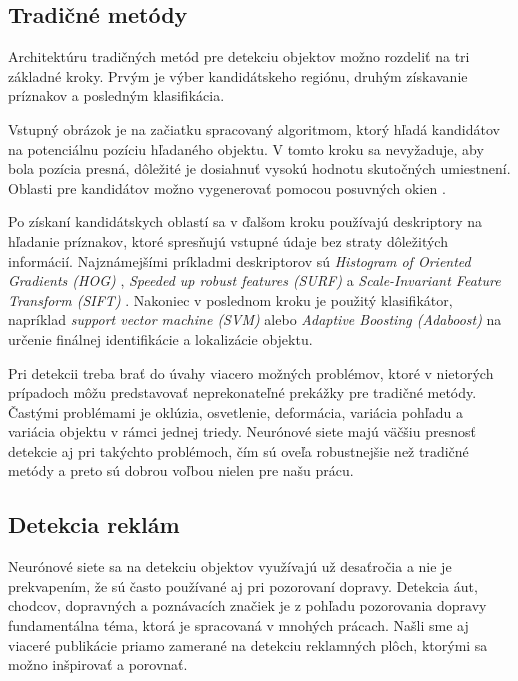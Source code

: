 \subsection{Tradičné metódy}

Architektúru tradičných metód pre detekciu objektov možno rozdeliť na tri základné kroky. Prvým je výber kandidátskeho regiónu, druhým získavanie príznakov a posledným klasifikácia.

Vstupný obrázok je na začiatku spracovaný algoritmom, ktorý hľadá kandidátov na potenciálnu pozíciu hľadaného objektu. V tomto kroku sa nevyžaduje, aby bola pozícia presná, dôležité je dosiahnuť vysokú hodnotu skutočných umiestnení. Oblasti pre kandidátov možno vygenerovať pomocou posuvných okien \cite{sel-search}.

Po získaní kandidátskych oblastí sa v ďalšom kroku používajú deskriptory na hľadanie príznakov, ktoré spresňujú vstupné údaje bez straty dôležitých informácií. Najznámejšími príkladmi deskriptorov sú \textit{Histogram of Oriented Gradients (HOG)} \cite{HOG}, \textit{Speeded up robust features (SURF)} \cite{SURF} a \textit{Scale-Invariant Feature Transform (SIFT)} \cite{SIFT}. Nakoniec v poslednom kroku je použitý klasifikátor, napríklad \textit{support vector machine (SVM)} \cite{SVM} alebo \textit{Adaptive Boosting (Adaboost)} \cite{Adaboost} na určenie finálnej identifikácie a lokalizácie objektu.

Pri detekcii treba brať do úvahy viacero možných problémov, ktoré v nietorých prípadoch môžu predstavovať neprekonateľné prekážky pre tradičné metódy. Častými problémami je oklúzia, osvetlenie, deformácia, variácia pohľadu a variácia objektu v rámci jednej triedy. Neurónové siete majú väčšiu presnosť detekcie aj pri takýchto problémoch, čím sú oveľa robustnejšie než tradičné metódy a preto sú dobrou voľbou nielen pre našu prácu.

\subsection{Detekcia reklám}

Neurónové siete sa na detekciu objektov využívajú už desaťročia a nie je prekvapením, že sú často používané aj pri pozorovaní dopravy. Detekcia áut, chodcov, dopravných a poznávacích značiek je z pohľadu pozorovania dopravy fundamentálna téma, ktorá je spracovaná v mnohých prácach. Našli sme aj viaceré publikácie priamo zamerané na detekciu reklamných plôch, ktorými sa možno inšpirovať a porovnať.

